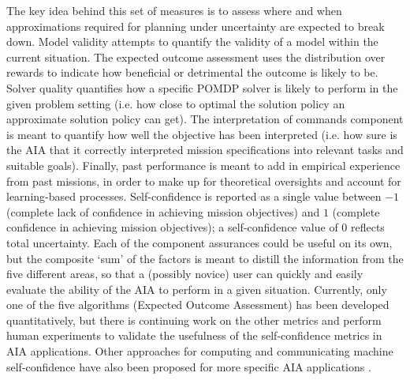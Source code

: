 The key idea behind this set of measures is to assess where and when approximations required for planning under uncertainty are expected to break down. Model validity attempts to quantify the validity of a model within the current situation. The expected outcome assessment uses the distribution over rewards to indicate how beneficial or detrimental the outcome is likely to be. Solver quality quantifies how a specific POMDP solver is likely to perform in the given problem setting (i.e. how close to optimal the solution policy an approximate solution policy can get). 
The interpretation of commands component is meant to quantify how well the objective has been interpreted (i.e. how sure is the AIA that it correctly interpreted mission specifications into relevant tasks and suitable goals). 
Finally, past performance is meant to add in empirical experience from past missions, in order to make up for theoretical oversights and account for learning-based processes. 
Self-confidence is reported as a single value between $-1$ (complete lack of confidence in achieving mission objectives) and $1$ (complete confidence in achieving mission objectives); a self-confidence value of $0$ reflects total uncertainty. 
Each of the component assurances could be useful on its own, but the composite `sum' of the factors is meant to distill the information from the five different areas, so that a (possibly novice) user can quickly and easily evaluate the ability of the AIA to perform in a given situation. 
Currently, only one of the five algorithms (Expected Outcome Assessment) has been developed quantitatively, but there is continuing work on the other metrics and perform human experiments to validate the usefulness of the self-confidence metrics in AIA applications. Other approaches for computing and communicating machine self-confidence have also been proposed for more specific AIA applications \cite{Hutchins2015-if, Kaipa2015-hy, Zagorecki2015-qy, Kuter2015-qh}. 

